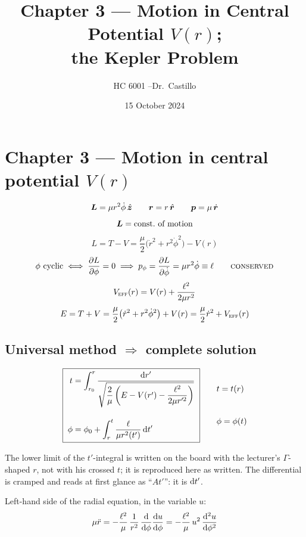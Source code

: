 \documentclass[11pt]{article}
\title{Chapter 3 --- Motion in Central Potential $V(r)$;\\ the Kepler Problem}
\author{HC 6001 \quad--\quad Dr.\ Castillo}
\date{15 October 2024}
\newcommand{\Veff}{V_{\textsc{eff}}}
\begin{document}
\maketitle

\section*{Chapter 3 --- Motion in central potential \texorpdfstring{$V(r)$}{V(r)}}

\[
\bm{L} = \mu r^{2}\dot\phi\,\hat{\bm{z}}
\qquad
\bm{r} = r\,\hat{\bm{r}}
\qquad
\bm{p} = \mu\,\dot{\bm{r}}
\]
\[
\bm{L} = \text{const.\ of motion}
\]
\[
L = T - V = \frac{\mu}{2}\bigl(\dot r^{2} + r^{2}\dot\phi^{2}\bigr) - V(r)
\]
\[
\phi\ \text{cyclic}
\iff \frac{\partial L}{\partial \phi} = 0
\;\Longrightarrow\;
p_{\phi} = \frac{\partial L}{\partial \dot\phi} = \mu r^{2}\dot\phi \equiv \ell
\qquad \text{\textsc{conserved}}
\]
\[
\Veff(r) = V(r) + \frac{\ell^{2}}{2\mu r^{2}}
\]
\[
E = T + V = \frac{\mu}{2}\bigl(\dot r^{2} + r^{2}\dot\phi^{2}\bigr) + V(r)
  = \frac{\mu}{2}\dot r^{2} + \Veff(r)
\]

\subsection*{Universal method \texorpdfstring{$\Rightarrow$}{=>} complete solution}

\[
\boxed{\;
\begin{aligned}
t &= \int_{r_{0}}^{r}
   \frac{\mathrm{d} r'}{\sqrt{\dfrac{2}{\mu}\left(E - V(r') - \dfrac{\ell^{2}}{2\mu r'^{2}}\right)}}\\[10pt]
\phi &= \phi_{0} + \int_{r}^{t} \frac{\ell}{\mu r^{2}(t')}\,\mathrm{d} t'
\end{aligned}\;}
\qquad
\begin{aligned}
&t = t(r)\\[24pt]
&\phi = \phi(t)
\end{aligned}
\]

\begin{remark}
The lower limit of the $t'$-integral is written on the board with the lecturer's
$\Gamma$-shaped $r$, not with his crossed $t$; it is reproduced here as written.
The differential is cramped and reads at first glance as ``$\!At'$'': it is $\mathrm{d} t'$.
\end{remark}

\noindent Left-hand side of the radial equation, in the variable $u$:
\[
\mu\ddot r
 = -\frac{\ell^{2}}{\mu}\,\frac{1}{r^{2}}\,\frac{\mathrm{d} }{\mathrm{d} \phi}\frac{\mathrm{d} u}{\mathrm{d} \phi}
 = -\frac{\ell^{2}}{\mu}\,u^{2}\,\frac{\mathrm{d}^{2} u}{\mathrm{d} \phi^{2}}
\]
\end{document}
